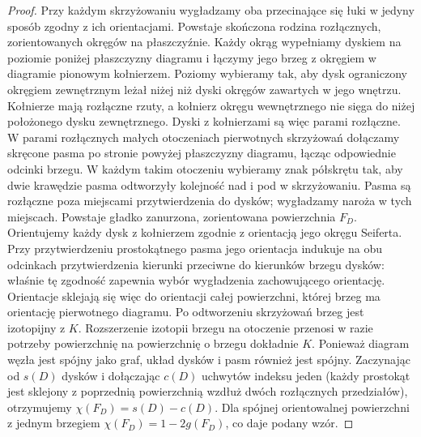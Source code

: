 \begin{proof}
Przy każdym skrzyżowaniu wygładzamy oba przecinające się łuki
w jedyny sposób zgodny z ich orientacjami. Powstaje skończona
rodzina rozłącznych, zorientowanych okręgów na płaszczyźnie.
Każdy okrąg wypełniamy dyskiem na poziomie poniżej
płaszczyzny diagramu i łączymy jego brzeg z okręgiem
w diagramie pionowym kołnierzem. Poziomy wybieramy tak,
aby dysk ograniczony okręgiem zewnętrznym leżał niżej
niż dyski okręgów zawartych w jego wnętrzu.
Kołnierze mają rozłączne rzuty, a kołnierz okręgu
wewnętrznego nie sięga do niżej położonego dysku
zewnętrznego. Dyski z kołnierzami są więc parami rozłączne.
W parami rozłącznych małych otoczeniach pierwotnych
skrzyżowań dołączamy skręcone pasma po stronie powyżej
płaszczyzny diagramu, łącząc odpowiednie odcinki brzegu.
W każdym takim otoczeniu wybieramy znak półskrętu tak,
aby dwie krawędzie pasma odtworzyły kolejność nad i pod
w skrzyżowaniu. Pasma są rozłączne poza miejscami
przytwierdzenia do dysków; wygładzamy naroża w tych miejscach.
Powstaje gładko zanurzona, zorientowana powierzchnia $F_D$.
Orientujemy każdy dysk z kołnierzem zgodnie z orientacją
jego okręgu Seiferta. Przy przytwierdzeniu prostokątnego
pasma jego orientacja indukuje na obu odcinkach
przytwierdzenia kierunki przeciwne do kierunków brzegu
dysków: właśnie tę zgodność zapewnia wybór wygładzenia
zachowującego orientację. Orientacje sklejają się więc
do orientacji całej powierzchni, której brzeg ma
orientację pierwotnego diagramu. Po odtworzeniu
skrzyżowań brzeg jest izotopijny z $K$. Rozszerzenie
izotopii brzegu na otoczenie przenosi w razie potrzeby
powierzchnię na powierzchnię o brzegu dokładnie $K$.
Ponieważ diagram węzła jest spójny jako graf, układ dysków
i pasm również jest spójny. Zaczynając od $s(D)$ dysków
i dołączając $c(D)$ uchwytów indeksu jeden (każdy prostokąt
jest sklejony z poprzednią powierzchnią wzdłuż dwóch
rozłącznych przedziałów), otrzymujemy
$\chi(F_D)=s(D)-c(D)$. Dla spójnej orientowalnej powierzchni
z jednym brzegiem $\chi(F_D)=1-2g(F_D)$, co daje podany wzór.
\end{proof}

